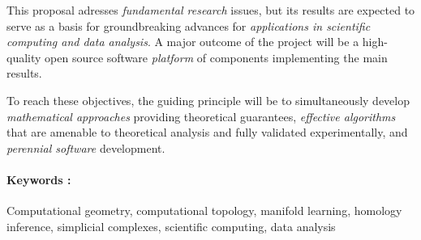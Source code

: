 \documentclass[a4paper, 11pt]{article}
\begin{document}
This proposal adresses {\em fundamental
  research} issues, but its results are expected to serve as a basis
for groundbreaking advances for {\em applications in scientific computing
and data analysis}.  A major outcome of the project will be a
high-quality open source software {\em platform} of components
implementing the main results.

To reach these objectives, the guiding principle  will be to simultaneously
develop {\em mathematical approaches} providing theoretical
guarantees, {\em effective algorithms} that are amenable to
theoretical analysis and fully validated experimentally, and {\em
  perennial software} development. 




\paragraph{Keywords :} Computational geometry, computational topology,
manifold learning, homology inference, simplicial complexes,
scientific computing, data analysis
\newpage


\end{document}
